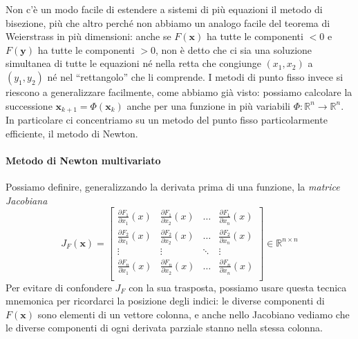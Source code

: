 \documentclass[a4paper]{report}
\theoremstyle{definiton}
\theoremstyle{remark}
\newcommand{\x}{\mathbf{x}}
\begin{document}
 Non c'è un modo facile di estendere a sistemi di più equazioni il metodo di bisezione, più che altro perché non abbiamo un analogo facile del teorema di Weierstrass in più dimensioni: anche se $F(\mathbf{x})$ ha tutte le componenti $<0$ e $F(\mathbf{y})$ ha tutte le componenti $>0$, non è detto che ci sia una soluzione simultanea di tutte le equazioni né nella retta che congiunge $(x_1,x_2)$ a $(y_1,y_2)$ né nel ``rettangolo'' che li comprende. I metodi di punto fisso invece si riescono a generalizzare facilmente, come abbiamo già visto: possiamo calcolare la successione $\x_{k+1} = \Phi(\x_k)$ anche per una funzione in più variabili $\Phi: \mathbb{R}^n \to \mathbb{R}^n$. In particolare ci concentriamo su un metodo del punto fisso particolarmente efficiente, il metodo di Newton.

\paragraph{Metodo di Newton multivariato}
Possiamo definire, generalizzando la derivata prima di una funzione, la \emph{matrice Jacobiana}
\[
J_F(\x) = 
\begin{bmatrix}
    \frac{\partial F_1}{\partial x_1}(x) & \frac{\partial F_1}{\partial x_2}(x) & \dots & \frac{\partial F_1}{\partial x_n}(x)\\
    \frac{\partial F_2}{\partial x_1}(x) & \frac{\partial F_2}{\partial x_2}(x) & \dots & \frac{\partial F_2}{\partial x_n}(x)\\
    \vdots & \vdots & \ddots & \vdots\\
    \frac{\partial F_n}{\partial x_1}(x) & \frac{\partial F_n}{\partial x_2}(x) & \dots & \frac{\partial F_n}{\partial x_n}(x)\\
\end{bmatrix} \in \mathbb{R}^{n\times n}
\]
Per evitare di confondere $J_F$ con la sua trasposta, possiamo usare questa tecnica mnemonica per ricordarci la posizione degli indici: le diverse componenti di $F(\x)$ sono elementi di un vettore colonna, e anche nello Jacobiano vediamo che le diverse componenti di ogni derivata parziale stanno nella stessa colonna. 
\end{document}
